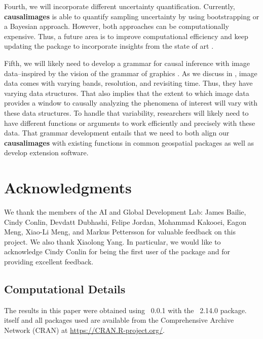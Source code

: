 \documentclass[nojss,shortnames]{jss} %
\begin{document}
Fourth, we will incorporate different uncertainty quantification. Currently, {\bf causalimages} is able to quantify sampling uncertainty by using bootstrapping or a Bayesian approach. However, both approaches can be computationally expensive. Thus, a future area is to improve computational efficiency and keep updating the package to incorporate insights from the state of art \citep{smith_uncertainty_2014,abdar_review_2021}.  

Fifth, we will likely need to develop a grammar for causal inference with image data--inspired by the vision of the grammar of graphics \citep{wilkinson_grammar_2005,tufte_visual_2001}. As we discuss in \citet{jerzak2022estimating,jejoda2022_hetero}, image data comes with varying bands, resolution, and revisiting time. Thus, they have varying data structures. That also implies that the extent to which image data provides a window to causally analyzing the phenomena of interest will vary with these data structures. To handle that variability, researchers will likely need to have different functions or arguments to work efficiently and precisely with these data. That grammar development entails that we need to both align our {\bf causalimages} with existing functions in common geospatial packages as well as develop extension software. 


\section*{Acknowledgments}
We thank the members of the AI and Global Development Lab: James Bailie, Cindy Conlin, Devdatt Dubhashi, Felipe Jordan, Mohammad Kakooei, Eagon Meng, Xiao-Li Meng, and Markus Pettersson for valuable feedback on this project. We also thank Xiaolong Yang. In particular, we would like to acknowledge Cindy Conlin for being the first user of the package and for providing excellent feedback.



\newpage
\begin{appendix}
\section{Computational Details}\label{s:ComputationalDetails}
The results in this paper were obtained using
~0.0.1 with the
~2.14.0 package.  itself
and all packages used are available from the Comprehensive
 Archive Network (CRAN) at
\url{https://CRAN.R-project.org/}.

\end{appendix}


\end{document}

